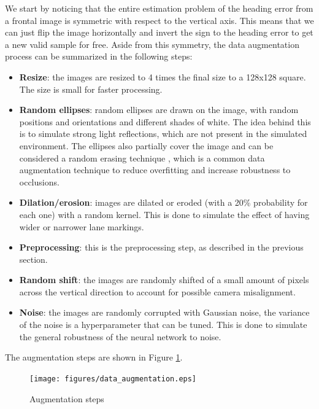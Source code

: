 \documentclass[a4paper,12pt,sort&compress]{article}
\begin{document}
    We start by noticing that the entire estimation problem of the heading error
    from a frontal image is symmetric with respect to the vertical axis. This means that we can just
    flip the image horizontally and invert the sign to the heading error to get a new valid sample for
    free. Aside from this symmetry, the data augmentation process can be summarized in the following
    steps:
    \begin{itemize}
        \item \textbf{Resize}: the images are resized to 4 times the final size to a 128x128
        square. The size is small for faster processing.
        \item \textbf{Random ellipses}: random ellipses are drawn on the image, with random
        positions and orientations and different shades of white. The idea behind this is to
        simulate strong light reflections, which are not present in the simulated environment. The
        ellipses also partially cover the image and can be considered a random erasing technique
        \citep*{random_erase}, which is a common data augmentation technique to reduce overfitting
        and increase robustness to occlusions. 
        \item \textbf{Dilation/erosion}: images are dilated or eroded (with a 20\% probability for
        each one) with a random kernel. This is done to simulate the effect of having wider or
        narrower lane markings. 
        \item \textbf{Preprocessing}: this is the preprocessing step, as described in the previous
        section. 
        \item \textbf{Random shift}: the images are randomly shifted of a small amount of pixels
        across the vertical direction to account for possible camera misalignment. 
        \item \textbf{Noise}: the images are randomly corrupted with Gaussian noise, the variance
        of the noise is a hyperparameter that can be tuned. This is done to simulate the general
        robustness of the neural network to noise.
    \end{itemize}
    The augmentation steps are shown in Figure \ref{fig:augmentation_steps}.

    \begin{figure}
        \centering
        \texttt{[image: figures/data\_augmentation.eps]}
        \caption{Augmentation steps}
        \label{fig:augmentation_steps}
    \end{figure}
\end{document}
